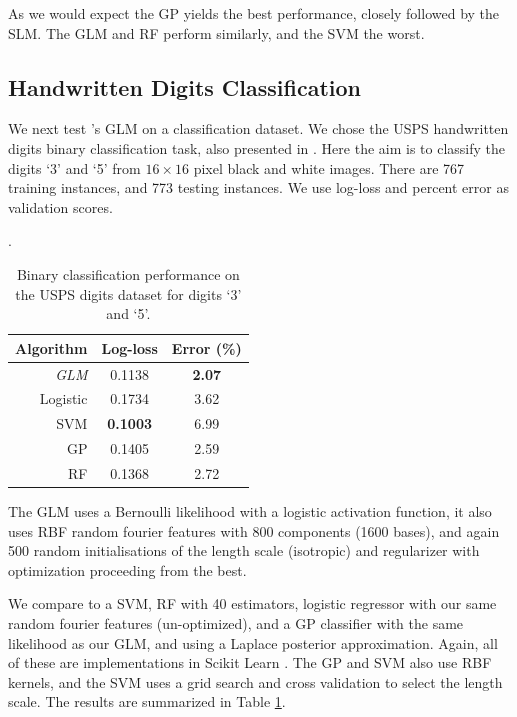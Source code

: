 \documentclass[11pt, oneside]{article}
\begin{document}
As we would expect the GP yields the best performance, closely followed by the
SLM. The GLM and RF perform similarly, and the SVM the worst. 


\subsection{Handwritten Digits Classification}

We next test \revrand{}'s GLM on a classification dataset. We chose the USPS
handwritten digits binary classification task, also presented in
\citet{Rasmussen2006}. Here the aim is to classify the digits `3' and `5' from
$16\times16$ pixel black and white images. There are 767 training instances,
and 773 testing instances. We use log-loss and percent error as validation
scores.

\begin{table}[bt]

    \centering
    \caption{Binary classification performance on the USPS digits dataset for
        digits `3' and `5'.} 
    \label{tab:handwritten}.
    \begin{tabular}{r|c c}
        \textbf{Algorithm} & \textbf{Log-loss} & \textbf{Error (\%)} \\
        \hline
        \emph{GLM} & 0.1138 & \textbf{2.07} \\
        Logistic & 0.1734 & 3.62 \\
        SVM & \textbf{0.1003} & 6.99 \\
        GP &  0.1405 & 2.59 \\
        RF & 0.1368 & 2.72 \\
        \hline
    \end{tabular}

\end{table}

The GLM uses a Bernoulli likelihood with a logistic activation function, it
also uses RBF random fourier features with 800 components (1600 bases), and
again 500 random initialisations of the length scale (isotropic) and
regularizer with optimization proceeding from the best.

We compare to a SVM, RF with 40 estimators, logistic regressor with our same
random fourier features (un-optimized), and a GP classifier with the same
likelihood as our GLM, and using a Laplace posterior approximation. Again, all
of these are implementations in Scikit Learn \citep{scikit-learn}. The GP and
SVM also use RBF kernels, and the SVM uses a grid search and cross validation
to select the length scale. The results are summarized in Table
\ref{tab:handwritten}.
\end{document}
